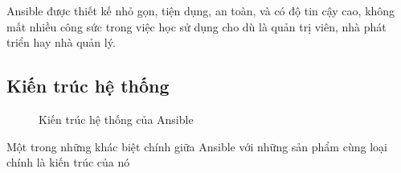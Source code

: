 Ansible được thiết kế nhỏ gọn, tiện dụng, an toàn, và có độ tin cậy cao, không mất nhiều công sức trong việc học sử dụng cho dù là quản trị viên, nhà phát triển hay nhà quản lý.

\subsection{Kiến trúc hệ thống}

\begin{figure}[h!]
    \begin{center}
    \end{center}
    \caption{Kiến trúc hệ thống của Ansible}
    \label{fig:ansible_arch}
\end{figure}

\newpage
\clearpage

Một trong những khác biệt chính giữa Ansible với những sản phẩm cùng loại chính là kiến trúc của nó

